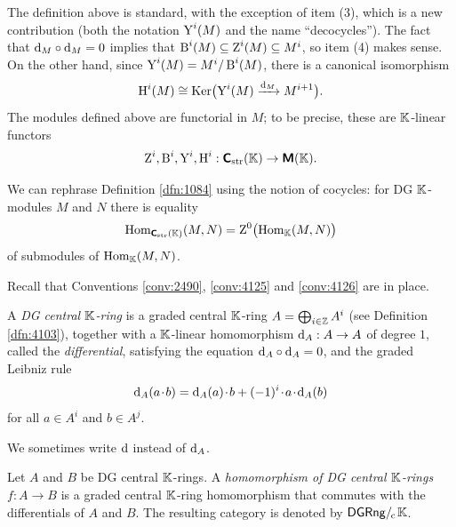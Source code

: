The definition above is standard, with the exception of item (3), which is 
a new contribution (both the notation $\operatorname{Y}^i(M)$ and the name 
``decocycles''). 
The fact that $\mathrm{d}_M \circ \mathrm{d}_M = 0$ implies that 
$\operatorname{B}^i(M) \subseteq \operatorname{Z}^i(M) \subseteq M^i$, so item (4) makes sense. 
On the other hand, since 
$\operatorname{Y}^i(M) = M^i / \operatorname{B}^i(M)$,
there is a canonical isomorphism 
\begin{equation} \label{eqn:2993}
\operatorname{H}^i(M) \cong \operatorname{Ker} \bigl( \operatorname{Y}^i(M) \xrightarrow{\mathrm{d}_M} M^{i + 1} \bigr) .
\end{equation}
The modules defined above are functorial in $M$; to be precise, these are 
$\mathbb{K}$-linear functors  
\begin{equation} \label{eqn:4127}
\operatorname{Z}^i, \operatorname{B}^i, \operatorname{Y}^i, \operatorname{H}^i  : 
\boldsymbol{\mathsf{C}}_{\mathrm{str}}(\mathbb{K}) \to \boldsymbol{\mathsf{M}}(\mathbb{K}) . 
\end{equation}

We can rephrase Definition \ref{dfn:1084} using the notion of cocycles:  for 
DG $\mathbb{K}$-modules $M$ and $N$ there is equality
\begin{equation} \label{eqn:2520}
\operatorname{Hom}_{\boldsymbol{\mathsf{C}}_{\mathrm{str}}(\mathbb{K})}(M, N) = 
\operatorname{Z}^0 \bigl( \operatorname{Hom}_{\mathbb{K}}(M, N) \bigr)
\end{equation}
of submodules of $\operatorname{Hom}_{\mathbb{K}}(M, N)$. 



 \label{subsec:DG-rng-mod}

Recall that Conventions \ref{conv:2490}, \ref{conv:4125} and \ref{conv:4126} 
are in place. 

\begin{dfn} \label{dfn:1071}
A {\em DG central $\mathbb{K}$-ring}
is a graded central $\mathbb{K}$-ring 
$A =  \bigoplus_{i \in \mathbb{Z}} A^i$ (see Definition \ref{dfn:4103}), together with 
a $\mathbb{K}$-linear homomorphism $\mathrm{d}_A : A \to A$ of degree $1$, called the {\em 
differential}, satisfying  the equation
$\mathrm{d}_A \circ \mathrm{d}_A = 0$, and the graded Leibniz rule
\[ \mathrm{d}_A(a \mspace{1.5mu}{\cdot}\mspace{1.5mu} b) =  \mathrm{d}_A(a) \mspace{1.5mu}{\cdot}\mspace{1.5mu} b + (-1)^i \mspace{1.5mu}{\cdot}\mspace{1.5mu} a \mspace{1.5mu}{\cdot}\mspace{1.5mu} \mathrm{d}_A(b) \]
for all $a \in A^i$ and $b \in A^j$. 
\end{dfn}

We sometimes write $\mathrm{d}$ instead of $\mathrm{d}_A$.

\begin{dfn} \label{dfn:1074}
Let $A$ and $B$ be DG central $\mathbb{K}$-rings. A 
{\em homomorphism of DG central $\mathbb{K}$-rings} 
$f : A \to B$ is a graded central 
$\mathbb{K}$-ring homomorphism that 
commutes with the differentials of $A$ and $B$.
The resulting category is denoted by $\mathrm{\mathsf{DGRng}} /_{\mspace{-2mu} \mathrm{c}} \mspace{2mu} \mathbb{K}$. 
\end{dfn}

